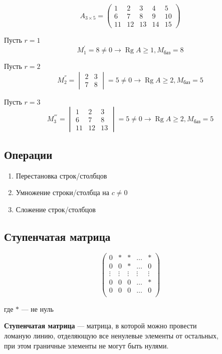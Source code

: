 \documentclass{article}
\DeclareMathOperator*{\Rg}{Rg}
\begin{document}
\[
A_{3 \times 5} = \begin{pmatrix}
	1 & 2 & 3 & 4 & 5 \\
	6 & 7 & 8 & 9 & 10 \\
	11 & 12 & 13 & 14 & 15
\end{pmatrix}
\]

Пусть $r = 1$
\[
	M_1^{'} = 8 \ne 0 \rightarrow \Rg{A} \ge 1, M_{\text{баз}} = 8
\]

Пусть $r = 2$
\[
	M_2^{''} = \begin{vmatrix}
		2 & 3 \\
		7 & 8
	\end{vmatrix}
	= 5 \ne 0 \rightarrow \Rg{A} \ge 2, M_{\text{баз}} = 5
\]

Пусть $r = 3$
\[
	M_3^{'''} = \begin{vmatrix}
		1 & 2 & 3 \\
		6 & 7 & 8 \\
		11 & 12 & 13
	\end{vmatrix}
	= 5 \ne 0 \rightarrow \Rg{A} \ge 2, M_{\text{баз}} = 5
\]

\subsection{Операции}

\begin{enumerate}
	\item Перестановка строк/столбцов
	\item Умножение строки/столбца на $c \ne 0$
	\item Сложение строк/столбцов
\end{enumerate}

\subsection{Ступенчатая матрица}

\[
\begin{pmatrix}
	0 & * & * & \dots & * \\
	0 & 0 & * & \dots & 0 \\
	\vdots & \vdots & \vdots & \vdots & \vdots \\
	0 & 0 & 0 & \dots & * \\
	0 & 0 & 0 & \dots & 0 \\
\end{pmatrix}
\]

где $*$ --- не нуль

\textbf{Ступенчатая матрица} --- матрица, в которой можно провести \\
ломаную линию, отделяющую все ненулевые элементы от остальных, \\
при этом граничные элементы не могут быть нулями.
\end{document}
